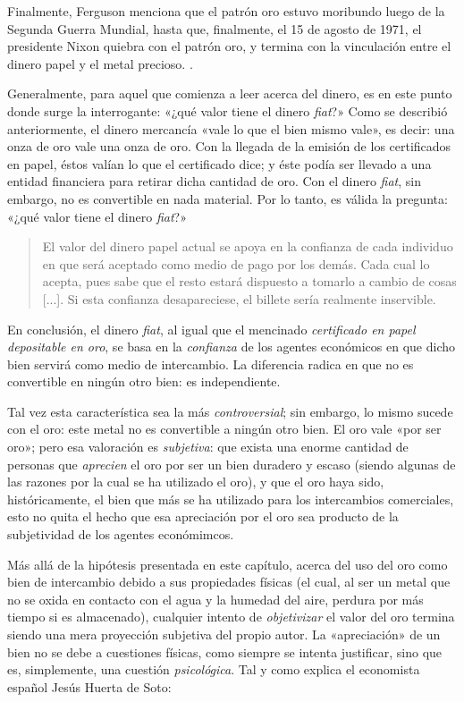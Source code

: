 \documentclass[12pt,a4paper,twoside]{book}
\begin{document}
Finalmente, Ferguson menciona que el patrón oro estuvo moribundo luego de la Segunda Guerra Mundial, hasta que, finalmente, el 15 de agosto de 1971, el presidente Nixon quiebra con el patrón oro, y termina con la vinculación entre el dinero papel y el metal precioso. \cite[pág. 76]{triunfo-dinero}.

Generalmente, para aquel que comienza a leer acerca del dinero, es en este punto donde surge la interrogante: «¿qué valor tiene el dinero \textit{fiat}?» Como se describió anteriormente, el dinero mercancía «vale lo que el bien mismo vale», es decir: una onza de oro vale una onza de oro. Con la llegada de la emisión de los certificados en papel, éstos valían lo que el certificado dice; y éste podía ser llevado a una entidad financiera para retirar dicha cantidad de oro. Con el dinero \textit{fiat}, sin embargo, no es convertible en nada material. Por lo tanto, es válida la pregunta: «¿qué valor tiene el dinero \textit{fiat}?»

\begin{quotation}
El valor del dinero papel actual se apoya en la confianza de cada individuo en que será aceptado como medio de pago por los demás. Cada cual lo acepta, pues sabe que el resto estará dispuesto a tomarlo a cambio de cosas [...]. Si esta confianza desapareciese, el billete sería realmente inservible. \cite[pág. 266]{mochobeker}
\end{quotation}

En conclusión, el dinero \textit{fiat}, al igual que el mencinado \textit{certificado en papel depositable en oro}, se basa en la \textit{confianza} de los agentes económicos en que dicho bien servirá como medio de intercambio. La diferencia radica en que no es convertible en ningún otro bien: es independiente.

Tal vez esta característica sea la más \textit{controversial}; sin embargo, lo mismo sucede con el oro: este metal no es convertible a ningún otro bien. El oro vale «por ser oro»; pero esa valoración es \textit{subjetiva}: que exista una enorme cantidad de personas que \textit{aprecien} el oro por ser un bien duradero y escaso (siendo algunas de las razones por la cual se ha utilizado el oro), y que el oro haya sido, históricamente, el bien que más se ha utilizado para los intercambios comerciales, esto no quita el hecho que esa apreciación por el oro sea producto de la subjetividad de los agentes económimcos.

Más allá de la hipótesis presentada en este capítulo, acerca del uso del oro como bien de intercambio debido a sus propiedades físicas (el cual, al ser un metal que no se oxida en contacto con el agua y la humedad del aire, perdura por más tiempo si es almacenado), cualquier intento de \textit{objetivizar} el valor del oro termina siendo una mera proyección subjetiva del propio autor. La «apreciación» de un bien no se debe a cuestiones físicas, como siempre se intenta justificar, sino que es, simplemente, una cuestión \textit{psicológica}. Tal y como explica el economista español Jesús Huerta de Soto:
\end{document}
